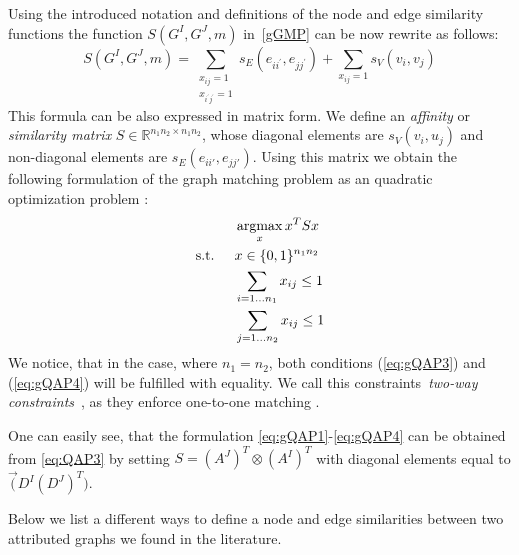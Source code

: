 Using the introduced notation and definitions of the node and edge similarity functions the function $S(G^I,G^J,m)$ in~\eqref{gGMP} can be now rewrite as follows:
\begin{equation}\label{eq:sumQAP}
	S(G^I,G^J,m)=\sum_{\substack{x_{ij}=1\\x_{i^\prime j^\prime}=1}}s_E(e_{ii^\prime},e_{jj^\prime}) + \sum_{x_{ij}=1}s_V(v_{i},v_{j})
\end{equation}
This formula can be also expressed in matrix form. We define an \emph{affinity} or \emph{similarity matrix} $S\in\mathbb{R}^{n_1n_2\times n_1n_2}$, whose diagonal elements are $s_V(v_i, u_j)$ and non-diagonal elements are $s_E(e_{ii\prime}, e_{jj\prime})$. Using this matrix we obtain the following formulation of the graph matching problem as an quadratic optimization problem \cite{Cho2014_Haystack, Cho2010_RRWM, Cho2012_ProgressiveGM, Conte2004,Rangarajan1996_GAGM,Leordeanu2005_SM,Leordeanu2009_IPFP}:
\begin{alignat}{2}
    &     && \argmax_x{x^TSx}                           \label{eq:gQAP1}\\ %
    & \text{s.t. } &&  x\in \{0,1\}^{n_1n_2}            \label{eq:gQAP2}\\
    &             &&  \sum_{i=1\dots n_1} x_{ij}\le 1    \label{eq:gQAP3}\\
    &             &&  \sum_{j=1\dots n_2} x_{ij}\le 1    \label{eq:gQAP4}
\end{alignat}
We notice, that in the case, where $n_1=n_2$, both conditions (\ref{eq:gQAP3}) and (\ref{eq:gQAP4}) will be fulfilled with equality. We call this constraints~\emph{two-way constraints}~\cite{Rangarajan1996_GAGM}, as they enforce one-to-one matching .

One can easily see, that the formulation \eqref{eq:gQAP1}-\eqref{eq:gQAP4} can be obtained from \eqref{eq:QAP3} by setting $S=(A^J)^T\otimes(A^I)^T$ with diagonal elements equal to $\vec(D^I(D^J)^T)$.

Below we list a different ways to define a node and edge similarities between two attributed graphs we found in the literature.

